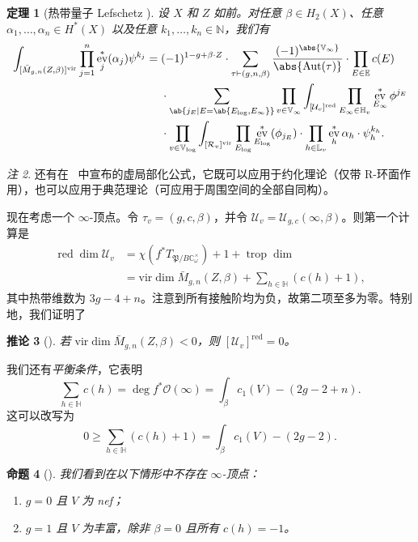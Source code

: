 \documentclass{amsart}
\newtheorem{thm}{定理}[section]
\newtheorem{cor}[thm]{推论}
\newtheorem{prop}[thm]{命题}
\theoremstyle{definition}
\theoremstyle{remark}
\newtheorem{rmk}[thm]{注}
\theoremstyle{plain}
\theoremstyle{definition}
\theoremstyle{remark}
\newcommand{\N}{\mathbb{N}}
\newcommand{\C}{\mathbb{C}}
\newcommand{\E}{\mathbb{E}}
\newcommand{\V}{\mathbb{V}}
\renewcommand{\H}{\mathbb{H}}
\renewcommand{\L}{\mathbb{L}}
\newcommand{\mc}[1]{\mathcal{#1}}
\newcommand{\mf}[1]{\mathfrak{#1}}
\newcommand{\mr}[1]{\mathrm{#1}}
\newcommand{\on}[1]{\operatorname{#1}}
\newcommand{\1}{\mathbf{1}}
\newcommand{\2}{\mathbf{2}}
\newcommand{\3}{\mathbf{3}}
\newcommand{\vir}{\mr{vir}}
\DeclareMathOperator{\Aut}{Aut}
\DeclareMathOperator{\ev}{ev}
\begin{document}
\begin{thm}[热带量子 Lefschetz {\cite{CJRtropical2025}}]
    设 \(X\) 和 \(Z\) 如前。对任意 \(\beta \in H_2(X)\)、任意 \(\alpha_1, \ldots, \alpha_n \in H^*(X)\) 以及任意 \(k_1, \ldots, k_n \in \N\)，我们有
    \begin{align*}
        \int_{[\bar{M}_{g,n}(Z,\beta)]^{\vir}} \prod_{j=1}^n \ev_j^* (\alpha_j) \psi^{k_j}={}& (-1)^{1-g+\beta \cdot Z} \cdot \sum_{\tau \vdash (g,n,\beta)} \frac{(-1)^{\abs{\V_{\infty}}}}{\abs{\Aut(\tau)}} \cdot \prod_{E \in \E} c(E) \\
        & \cdot \sum_{\ab\{j_E \mid E = \ab\{E_{\log}, E_{\infty}\}\}}  \prod_{v \in \V_{\infty}} \int_{[\mc{U}_v]^{\on{red}}} \prod_{E_{\infty} \in \H_v} \ev_{E_{\infty}}^* \phi^{j_E}  \\
        &  \cdot \prod_{v \in \V_{\log}} \int_{[\mc{R}_v]^{\vir}} \prod_{E_{\log}} \ev_{E_{\log}}^* (\phi_{j_E}) \cdot \prod_{h \in \L_v} \ev_h^* \alpha_h \cdot \psi_h^{k_h} .
    \end{align*}
\end{thm}

\begin{rmk}
    还有在~\cite{CJRlocalization} 中宣布的虚局部化公式，它既可以应用于约化理论（仅带 R-环面作用），也可以应用于典范理论（可应用于周围空间的全部自同构）。
\end{rmk}

现在考虑一个 \(\infty\)-顶点。令 \(\tau_v = (g, c, \beta)\)，并令 \(\mc{U}_v = \mc{U}_{g,c}(\infty, \beta)\)。则第一个计算是
\begin{align*}
    \on{red}\dim \mc{U}_v &= \chi(f^* T_{\mf{P}/B \C^{\times}_{\omega}}) + 1 + \on{trop}\dim  \\
    &= \vir\dim \bar{M}_{g,n}(Z, \beta) + \sum_{h \in \H } (c(h) + 1),
\end{align*}
其中热带维数为 \(3g-4+n\)。注意到所有接触阶均为负，故第二项至多为零。特别地，我们证明了
\begin{cor}[{\cite{CJRpunctured}}]
    若 \(\vir\dim \bar{M}_{g,n}(Z,\beta) < 0\)，则 \([\mc{U}_v]^{\on{red}} = 0\)。
\end{cor}
我们还有\textit{平衡条件}，它表明
\begin{equation}\label{eqn:balancing condition}
    \sum_{h \in \H} c(h) = \deg f^* \mc{O}(\infty) = \int_{\beta} c_1(V) - (2g-2+n).
\end{equation}
这可以改写为
\[ 0 \geq \sum_{h \in \H} (c(h)+1) = \int_{\beta} c_1(V) - (2g-2). \]
\begin{prop}[{\cite{CJRpunctured}}]
    我们看到在以下情形中不存在 \(\infty\)-顶点：
    \begin{enumerate}
        \item \(g = 0\) 且 \(V\) 为 nef；
        \item \(g=1\) 且 \(V\) 为丰富，除非 \(\beta = 0\) 且所有 \(c(h) = -1\)。
    \end{enumerate}
\end{prop}
\end{document}
